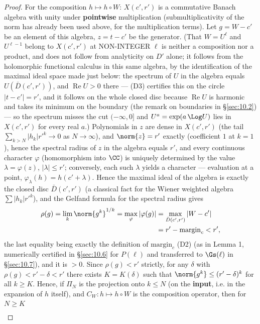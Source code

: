 \begin{proof}
For the composition $h \mapsto h\circ W$: $X(c',r')$ is a commutative Banach algebra with
unity under \textbf{pointwise} multiplication (submultiplicativity of the norm has
already been used above, for the multiplication terms). Let $g = W - c'$ be an element of this algebra, $z = t - c'$ be the generator. (That $W = U^{\ell}$ and $U^{\ell-1}$ belong to $X(c',r')$ at NON-INTEGER $\ell$ is neither a composition nor a product, and does not follow from analyticity on $D'$ alone; it follows from the holomorphic functional calculus in this same algebra, by the identification of the maximal ideal space made just below: the spectrum of $U$ in the algebra equals $U(\bar D(c',r'))$, and $\operatorname{Re} U > 0$ there --- (D3) certifies this on the circle $|t-c'| = r'$, and it follows on the whole closed disc because $\operatorname{Re} U$ is harmonic and takes its minimum on the boundary (the remark on boundaries in \S\ref{sec:10.2}) --- so the spectrum misses the cut $(-\infty,0]$ and $U^{a} = \exp(a\,\Log U)$ lies in $X(c',r')$ for every real $a$.) Polynomials in $z$
are dense in $X(c',r')$ (the tail $\sum_{k>N}|h_k| r'^k \to 0$ as $N\to\infty$), and
$\norm{z} = r'$ exactly (coefficient $1$ at $k=1$), hence the spectral radius of
$z$ in the algebra equals $r'$, and every continuous character $\varphi$ (homomorphism
into $\CC$) is uniquely determined by the value $\lambda = \varphi(z)$, $|\lambda| \le r'$; conversely,
each such $\lambda$ yields a character --- evaluation at a point, $\varphi_\lambda(h) = h(c'+\lambda)$.
Hence the maximal ideal of the algebra is exactly the closed disc $\bar D(c',r')$
(a classical fact for the Wiener weighted algebra $\sum|h_k| r'^k$), and the Gelfand
formula for the spectral radius gives
\begin{align*}
\rho(g) = \lim_k \norm{g^k}^{1/k} = \max_\varphi |\varphi(g)| &= \max_{\bar D(c',r')} |W - c'| \\
&= r' - \mathrm{margin}_c < r' ,
\end{align*}
the last equality being exactly the definition of $\mathrm{margin}_c$ (D2) (as in
Lemma 1, numerically certified in \S\ref{sec:10.6} for $P(\ell)$ and transferred to $\Gs(\ell)$
in \S\ref{sec:10.7}), and it is $>0$.
Since $\rho(g) < r'$ strictly, for any $\delta$ with $\rho(g) < r'-\delta < r'$ there exists
$K = K(\delta)$ such that $\norm{g^k} \le (r'-\delta)^k$ for all $k \ge K$. Hence, if $\Pi_N$
is the projection onto $k \le N$ (on the \textbf{input}, i.e. in the expansion of
$h$ itself), and $C_W : h \mapsto h\circ W$ is the composition operator, then for
$N \ge K$
\begin{align*}

\end{align*}
\end{proof}

